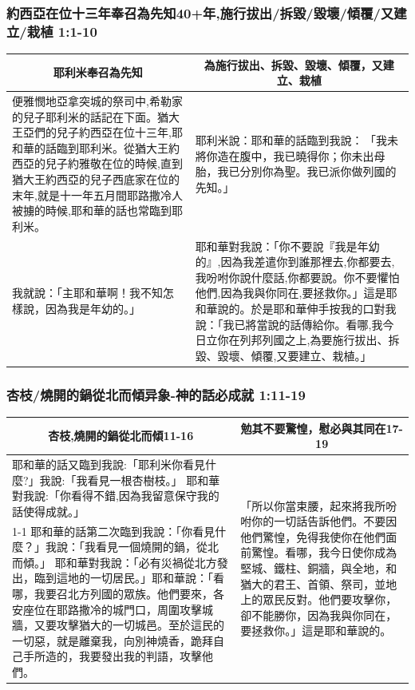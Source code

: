 \subsubsection{約西亞在位十三年奉召為先知40+年,施行拔出/拆毀/毀壞/傾覆/又建立/栽植 1:1-10}
\begin{table}[H]
\centering
\begin{tabular}{p{9cm}|p{8.40cm}}\hline\hline
\multicolumn{1}{c|}{耶利米奉召為先知}&\multicolumn{1}{c}{為施行拔出、拆毀、毀壞、傾覆，又建立、栽植}\\\hline
便雅憫地亞拿突城的祭司中,希勒家的兒子耶利米的話記在下面。猶大王亞們的兒子約西亞在位十三年,耶和華的話臨到耶利米。從猶大王約西亞的兒子約雅敬在位的時候,直到猶大王約西亞的兒子西底家在位的末年,就是十一年五月間耶路撒冷人被擄的時候,耶和華的話也常臨到耶利米。
&耶利米說：耶和華的話臨到我說： 「我未將你造在腹中，我已曉得你；你未出母胎，我已分別你為聖。我已派你做列國的先知。」 \\\hline
我就說：「主耶和華啊！我不知怎樣說，因為我是年幼的。」 
&耶和華對我說：「你不要說『我是年幼的』,因為我差遣你到誰那裡去,你都要去,我吩咐你說什麼話,你都要說。你不要懼怕他們,因為我與你同在,要拯救你。」這是耶和華說的。於是耶和華伸手按我的口對我說：「我已將當說的話傳給你。看哪,我今日立你在列邦列國之上,為要施行拔出、拆毀、毀壞、傾覆,又要建立、栽植。」
\\\hline
\end{tabular}
\end{table}

\subsubsection{杏枝/燒開的鍋從北而傾异象-神的話必成就 1:11-19}
\begin{table}[H]
\centering
\begin{tabular}{p{11.25cm}|p{5.50cm}}\hline\hline
\multicolumn{1}{c|}{杏枝,燒開的鍋從北而傾11-16}&\multicolumn{1}{c}{勉其不要驚惶，慰必與其同在17-19}\\\hline
耶和華的話又臨到我說:「耶利米你看見什麼?」我說:「我看見一根杏樹枝。」 耶和華對我說:「你看得不錯,因為我留意保守我的話使得成就。」
&\multirow{2}{5.86cm}{「所以你當束腰，起來將我所吩咐你的一切話告訴他們。不要因他們驚惶，免得我使你在他們面前驚惶。看哪，我今日使你成為堅城、鐵柱、銅牆，與全地，和猶大的君王、首領、祭司，並地上的眾民反對。他們要攻擊你，卻不能勝你，因為我與你同在，要拯救你。」這是耶和華說的。}\\\cline{1-1}
耶和華的話第二次臨到我說：「你看見什麼？」我說：「我看見一個燒開的鍋，從北而傾。」 耶和華對我說：「必有災禍從北方發出，臨到這地的一切居民。」耶和華說：「看哪，我要召北方列國的眾族。他們要來，各安座位在耶路撒冷的城門口，周圍攻擊城牆，又要攻擊猶大的一切城邑。至於這民的一切惡，就是離棄我，向別神燒香，跪拜自己手所造的，我要發出我的判語，攻擊他們。&\\\hline
\end{tabular}
\end{table}

